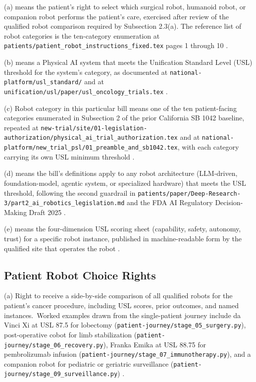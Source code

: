 \hspace{0.5cm} (a)  means the patient's right to
select which surgical robot, humanoid robot, or companion robot
performs the patient's care, exercised after review of the qualified
robot comparison required by Subsection 2.3(a). The reference list of
robot categories is the ten-category enumeration at
\texttt{patients/patient\_robot\_instructions\_fixed.tex} pages 1
through 10 \cite{kawchak_2026_18810541}.

(b)  means a Physical AI system that meets
the Unification Standard Level (USL) threshold for the system's
category, as documented at \texttt{national-platform/usl\_standard/}
and at \texttt{unification/usl/paper/usl\_oncology\_trials.tex}
\cite{kawchak_2026_18778219}.

(c) {Robot category} in this particular bill means one of the ten patient-facing categories
enumerated in Subsection 2 of the prior California SB 1042 baseline,
repeated at
\texttt{new-trial/site/01-legislation-authorization/physical\_ai\_trial\_authorization.tex}
and at
\texttt{national-platform/new\_trial\_psl/01\_preamble\_and\_sb1042.tex},
with each category carrying its own USL minimum threshold
\cite{kawchak_2026_19176370}.

(d)  means the bill's definitions apply
to any robot architecture (LLM-driven, foundation-model, agentic
system, or specialized hardware) that meets the USL threshold,
following the second guardrail in
\texttt{patients/paper/Deep-Research-3/part2\_ai\_robotics\_legislation.md}
and the FDA AI Regulatory Decision-Making Draft 2025
\cite{fda_ai_regulatory_decision_draft_2025}.

(e)  means the four-dimension USL
scoring sheet (capability, safety, autonomy, trust) for a specific
robot instance, published in machine-readable form by the qualified
site that operates the robot \cite{kawchak_2026_18778219}.

\subsection{Patient Robot Choice Rights}

\hspace{0.5cm} (a) Right to receive a side-by-side comparison of all qualified
robots for the patient's cancer procedure, including USL scores, prior
outcomes, and named instances.\ Worked examples drawn from the
single-patient journey include da Vinci Xi at USL 87.5 for lobectomy
(\texttt{patient-journey/stage\_05\_surgery.py}), post-operative
cobot for limb stabilization
(\texttt{patient-journey/stage\_06\_recovery.py}), Franka Emika at
USL 88.75 for pembrolizumab infusion
(\texttt{patient-journey/stage\_07\_immunotherapy.py}), and a
companion robot for pediatric or geriatric surveillance
(\texttt{patient-journey/stage\_09\_surveillance.py})
\cite{kawchak_2026_19119939}.

